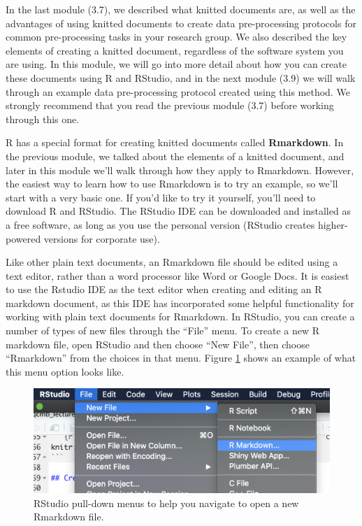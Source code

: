 \documentclass[]{tufte-book}
\begin{document}
In the last module (3.7), we described what knitted documents are, as well as the
advantages of using knitted documents to create data pre-processing protocols
for common pre-processing tasks in your research group. We also described the
key elements of creating a knitted document, regardless of the software system
you are using. In this module, we will
go into more detail about how you can create these documents using R and
RStudio, and in the next module (3.9) we will walk through an example data
pre-processing protocol created using this method. We strongly recommend that
you read the previous module (3.7) before working through this one.

R has a special format for creating knitted documents called \textbf{Rmarkdown}.
In the previous module, we talked about the elements of a knitted document, and
later in this module we'll walk through how they apply to Rmarkdown. However,
the easiest way to learn how to use Rmarkdown is to try an example, so we'll
start with a very basic one. If you'd like to try it yourself, you'll need
to download R and RStudio. The RStudio IDE can be
downloaded and installed as a free software, as long as you use the personal
version (RStudio creates higher-powered versions for corporate use).

Like other plain text documents, an Rmarkdown file should be edited using a text
editor, rather than a word processor like Word or Google Docs. It is easiest to
use the Rstudio IDE as the text editor when creating and editing an R markdown
document, as this IDE has incorporated some helpful functionality for working
with plain text documents for Rmarkdown. In RStudio, you can create a number of
types of new files through the ``File'' menu. To create a new R markdown file,
open RStudio and then choose ``New File'', then choose ``Rmarkdown'' from the
choices in that menu. Figure \ref{fig:rmarkdownnewfile} shows an example of
what this menu option looks like.

\begin{figure}
\includegraphics[width=\textwidth]{figures/rmarkdown_newfile} \caption[RStudio pull-down menus to help you navigate to open a new Rmarkdown file]{RStudio pull-down menus to help you navigate to open a new Rmarkdown file.}\label{fig:rmarkdownnewfile}
\end{figure}
\end{document}
